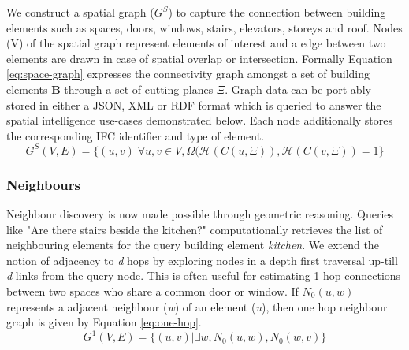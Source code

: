 \documentclass[conference]{IEEEtran}
\begin{document}
We construct a spatial graph ($G^S$) to capture the connection between building elements such as spaces, doors, windows, stairs, elevators, storeys and roof. Nodes (V) of the spatial graph represent elements of interest and a edge between two elements are drawn in case of spatial overlap or intersection. Formally Equation \ref{eq:space-graph} expresses the connectivity graph amongst a set of building elements \textbf{B} through a set of cutting planes $\Xi$. Graph data can be port-ably stored in either a JSON, XML or RDF format which is queried to answer the spatial intelligence use-cases demonstrated below. Each node additionally stores the corresponding IFC identifier and type of element.
\begin{equation}
G^S (V,E)= \{ (u, v) |\forall u,v \in V, \Omega( \mathcal{H} ( C(u, \Xi)),  \mathcal{H} (C(v,\Xi) ) =1\}
\label{eq:space-graph}
\end{equation}


\subsubsection{Neighbours   }

Neighbour discovery is now made possible through geometric reasoning. Queries like "Are there stairs beside the kitchen?" computationally retrieves the list of neighbouring elements for the query building element \textit{kitchen}. We extend the notion of adjacency to \textit{d} hops by exploring nodes in a depth first traversal up-till \textit{d} links from the query node. This is often useful for estimating 1-hop connections between two spaces who share a common door or window. If $N_0(u, w)$ represents a adjacent neighbour (\textit{w}) of an element (\textit{u}), then one hop neighbour graph is given by Equation \ref{eq:one-hop}.
\begin{equation}
G^1(V, E) = \{(u, v) | \exists w, N_0(u, w), N_0(w, v) \}
\label{eq:one-hop}
\end{equation}
\end{document}
